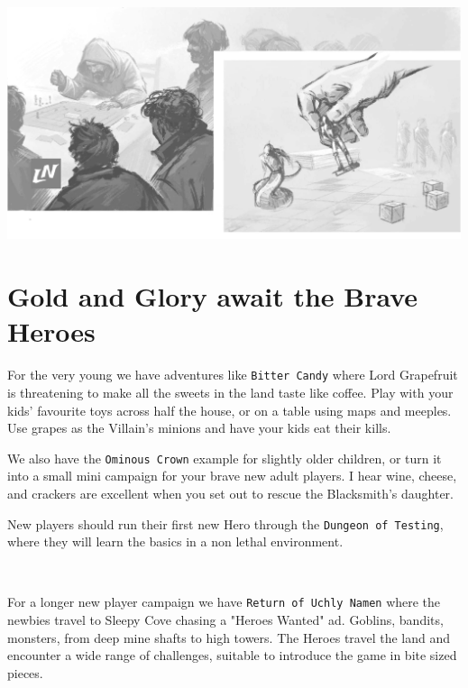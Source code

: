 \begin{center}
\includegraphics[width=0.999\textwidth]{./fig/tabletop.jpg}
\end{center}








\clearpage %

\section*{Gold and Glory await the Brave Heroes}

\noindent
For the very young we have adventures like \texttt{Bitter Candy} where Lord Grapefruit is threatening to make all the sweets in the land taste like coffee. Play with your kids' favourite toys across half the house, or on a table using maps and meeples. Use grapes as the Villain's minions and have your kids eat their kills.

We also have the \texttt{Ominous Crown} example for slightly older children, or turn it into a small mini campaign for your brave new adult players. I hear wine, cheese, and crackers are excellent when you set out to rescue the Blacksmith's daughter.

New players should run their first new Hero through the \texttt{Dungeon of Testing}, where they will learn the basics in a non lethal environment.

\

\noindent
For a longer new player campaign we have \texttt{Return of Uchly Namen} where the newbies travel to Sleepy Cove chasing a "Heroes Wanted" ad. Goblins, bandits, monsters, from deep mine shafts to high towers. The Heroes travel the land and encounter a wide range of challenges, suitable to introduce the game in bite sized pieces.

